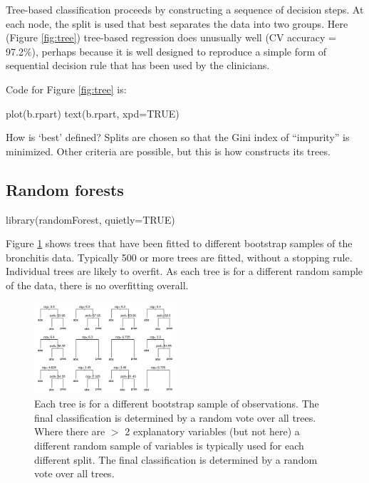 Tree-based classification proceeds by constructing a sequence of
decision steps. At each node, the split is used that best separates
the data into two groups.  Here (Figure \ref{fig:tree}) tree-based
regression does unusually well (CV accuracy = 97.2\%), perhaps because
it is well designed to reproduce a simple form of sequential decision
rule that has been used by the clinicians.

\begin{marginfigure}
Code for Figure \ref{fig:tree} is:
\begin{Schunk}
\begin{Sinput}
plot(b.rpart)
text(b.rpart, xpd=TRUE)
\end{Sinput}
\end{Schunk}
\end{marginfigure}

How is `best' defined? Splits are chosen so that the Gini index of
``impurity'' is minimized.  Other criteria are possible, but this is
how  constructs its trees.

\subsection{Random forests}

\begin{Schunk}
\begin{Sinput}
library(randomForest, quietly=TRUE)
\end{Sinput}
\end{Schunk}

Figure \ref{fig:brontrees} shows trees that have been fitted to
different bootstrap samples of the bronchitis data.  Typically 500 or
more trees are fitted, without a stopping rule.  Individual trees are
likely to overfit.  As each tree is for a different random sample of
the data, there is no overfitting overall.

\begin{figure}
\begin{Schunk}


\centerline{\includegraphics[width=0.47\textwidth]{figs/12-rf-x-bronchit-1} }

\end{Schunk}
\caption{Each tree is for a different bootstrap sample of
  observations.  The final classification is determined by a random
  vote over all trees.  Where there are $>$ 2 explanatory variables
  (but not here) a different random sample of variables is typically
  used for each different split. The final classification is
  determined by a random vote over all trees.}\label{fig:brontrees}
\end{figure}

